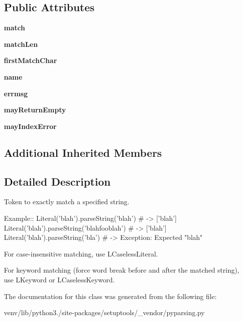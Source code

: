 \subsection*{Public Attributes}
\begin{DoxyCompactItemize}
\item 
\mbox{\label{classsetuptools_1_1__vendor_1_1pyparsing_1_1_literal_a5c1178257621baaa502a28e17f59979c}} 
{\bfseries match}
\item 
\mbox{\label{classsetuptools_1_1__vendor_1_1pyparsing_1_1_literal_ae287653a858bbb1dcd80d3bfe8c02e49}} 
{\bfseries match\+Len}
\item 
\mbox{\label{classsetuptools_1_1__vendor_1_1pyparsing_1_1_literal_ac8770c2d843208fb9157e56795ffeb48}} 
{\bfseries first\+Match\+Char}
\item 
\mbox{\label{classsetuptools_1_1__vendor_1_1pyparsing_1_1_literal_ae3a2e5191c789719d4a29f4b725a8181}} 
{\bfseries name}
\item 
\mbox{\label{classsetuptools_1_1__vendor_1_1pyparsing_1_1_literal_a5559ddb4cf4d7a8b7bc54d0b0856b64d}} 
{\bfseries errmsg}
\item 
\mbox{\label{classsetuptools_1_1__vendor_1_1pyparsing_1_1_literal_ad6d26490f765bf99fabcf3f3d7fbdd19}} 
{\bfseries may\+Return\+Empty}
\item 
\mbox{\label{classsetuptools_1_1__vendor_1_1pyparsing_1_1_literal_aa63a44407af1029deac1e7d5ada748e3}} 
{\bfseries may\+Index\+Error}
\end{DoxyCompactItemize}
\subsection*{Additional Inherited Members}


\subsection{Detailed Description}
\begin{DoxyVerb}Token to exactly match a specified string.

Example::
    Literal('blah').parseString('blah')  # -> ['blah']
    Literal('blah').parseString('blahfooblah')  # -> ['blah']
    Literal('blah').parseString('bla')  # -> Exception: Expected "blah"

For case-insensitive matching, use L{CaselessLiteral}.

For keyword matching (force word break before and after the matched string),
use L{Keyword} or L{CaselessKeyword}.
\end{DoxyVerb}
 

The documentation for this class was generated from the following file\+:\begin{DoxyCompactItemize}
\item 
venv/lib/python3./site-\/packages/setuptools/\+\_\+vendor/pyparsing.\+py\end{DoxyCompactItemize}
